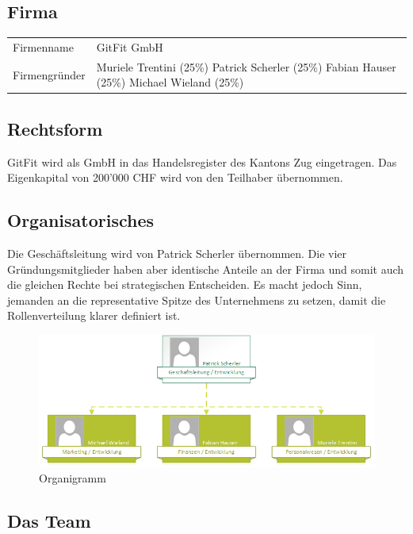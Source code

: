 \subsection{Firma}
\begin{tabu} to \linewidth {l X}
	Firmenname & GitFit GmbH \\
	Firmengründer & Muriele Trentini (25\%)  \newline Patrick Scherler (25\%) \newline Fabian Hauser (25\%) \newline Michael Wieland (25\%) \\
\end{tabu} 

\subsection{Rechtsform}
GitFit wird als GmbH in das Handelsregister des Kantons Zug eingetragen. Das Eigenkapital von 200'000 CHF wird von den Teilhaber übernommen.


\subsection{Organisatorisches}
Die Geschäftsleitung wird von Patrick Scherler übernommen. Die vier Gründungsmitglieder haben aber identische Anteile an der Firma und somit auch die gleichen Rechte bei strategischen Entscheiden. Es macht jedoch Sinn, jemanden an die representative Spitze des Unternehmens zu setzen, damit die Rollenverteilung klarer definiert ist.
\begin{figure}[h]
	\centering
	\includegraphics[width=0.9\linewidth]{images/organigramm}
	\caption{Organigramm}
	\label{fig:organigramm}
\end{figure}

\clearpage

\subsection{Das Team}

